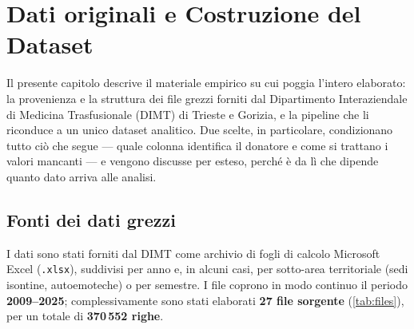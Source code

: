 
\chapter{Dati originali e Costruzione del Dataset}
\label{ch:data}

Il presente capitolo descrive il materiale empirico su cui poggia l'intero
elaborato: la provenienza e la struttura dei file grezzi forniti dal
Dipartimento Interaziendale di Medicina Trasfusionale (DIMT) di Trieste e
Gorizia, e la pipeline che li riconduce a un unico dataset analitico. Due
scelte, in particolare, condizionano tutto ciò che segue --- quale colonna
identifica il donatore e come si trattano i valori mancanti --- e vengono
discusse per esteso, perché è da lì che dipende quanto dato arriva alle analisi.


\section{Fonti dei dati grezzi}
\label{sec:rawdata}

I dati sono stati forniti dal DIMT come archivio di fogli di calcolo Microsoft
Excel (\texttt{.xlsx}), suddivisi per anno e, in alcuni casi, per sotto-area
territoriale (sedi isontine, autoemoteche) o per semestre. I file coprono in
modo continuo il periodo \textbf{2009--2025}; complessivamente sono stati
elaborati \textbf{27 file sorgente} (\cref{tab:files}), per un totale di
\textbf{370\,552 righe}.

